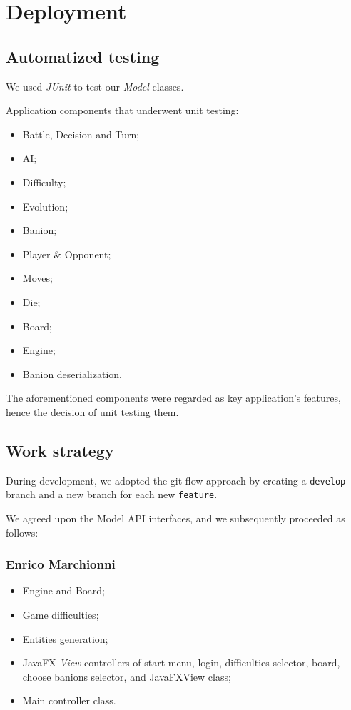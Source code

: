 \documentclass[12pt, a4paper]{report}
\theoremstyle{definition}
\begin{document}
\chapter{Deployment}

\section{Automatized testing}

    We used \emph{JUnit} to test our \emph{Model} classes.

    Application components that underwent unit testing:

    \begin{itemize}
        \item Battle, Decision and Turn;
        \item AI;
        \item Difficulty;
        \item Evolution;
        \item Banion;
        \item Player \& Opponent;
        \item Moves;
        \item Die;
        \item Board;
        \item Engine;
        \item Banion deserialization.
    \end{itemize}

    The aforementioned components were regarded as key application's features, hence the decision of unit testing them.

\section{Work strategy}

    During development, we adopted the git-flow approach by creating a \verb|develop| branch and a new branch for each new \verb|feature|.

    We agreed upon the Model API interfaces, and we subsequently proceeded as follows:

    \subsection*{Enrico Marchionni}

    \begin{itemize}
        \item Engine and Board;
        \item Game difficulties;
        \item Entities generation;
        \item JavaFX \emph{View} controllers of start menu, login, difficulties selector, board, choose banions selector, and JavaFXView class;
        \item Main controller class.
    \end{itemize}
\end{document}

